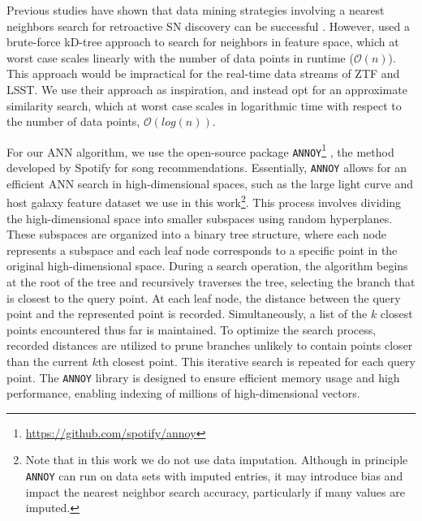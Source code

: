 \documentclass[twocolumn]{aastex63}
\newcommand{\annoy}{\texttt{ANNOY}}
\begin{document}
Previous studies have shown that data mining strategies involving a nearest neighbors search for retroactive SN discovery can be successful \citep{Aleo2022}. However, \cite{Aleo2022} used a brute-force kD-tree approach to search for neighbors in feature space, which at worst case scales linearly with the number of data points in runtime ($\mathcal{O}(n)$). This approach would be impractical for the real-time data streams of ZTF and LSST. We use their approach as inspiration, and instead opt for an approximate similarity search, which at worst case scales in logarithmic time with respect to the number of data points, $\mathcal{O}(log(n))$. \par %

For our ANN algorithm, we use the open-source package \annoy{}\footnote{\url{https://github.com/spotify/annoy}} \citep{Github:annoy}, the method developed by Spotify for song recommendations. Essentially, \annoy{} allows for an efficient ANN search in high-dimensional spaces, such as the large light curve and host galaxy feature dataset we use in this work\footnote{Note that in this work we do not use data imputation. Although in principle \annoy{} can run on data sets with imputed entries, it may introduce bias and impact the nearest neighbor search accuracy, particularly if many values are imputed.}. This process involves dividing the high-dimensional space into smaller subspaces using random hyperplanes. These subspaces are organized into a binary tree structure, where each node represents a subspace and each leaf node corresponds to a specific point in the original high-dimensional space. During a search operation, the algorithm begins at the root of the tree and recursively traverses the tree, selecting the branch that is closest to the query point. At each leaf node, the distance between the query point and the represented point is recorded. Simultaneously, a list of the $k$ closest points encountered thus far is maintained. To optimize the search process, recorded distances are utilized to prune branches unlikely to contain points closer than the current $k$th closest point. This iterative search is repeated for each query point. The \annoy{} library is designed to ensure efficient memory usage and high performance, enabling indexing of millions of high-dimensional vectors. \par %
\end{document}
